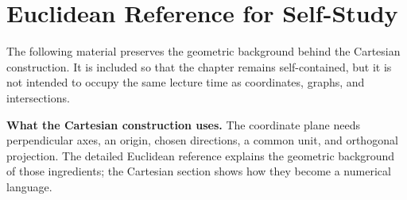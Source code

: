 \section{Euclidean Reference for Self-Study}

The following material preserves the geometric background behind the Cartesian construction. It is included so that the chapter remains self-contained, but it is not intended to occupy the same lecture time as coordinates, graphs, and intersections.









\noindent\textbf{What the Cartesian construction uses.} The coordinate plane needs perpendicular axes, an origin, chosen directions, a common unit, and orthogonal projection. The detailed Euclidean reference explains the geometric background of those ingredients; the Cartesian section shows how they become a numerical language.
